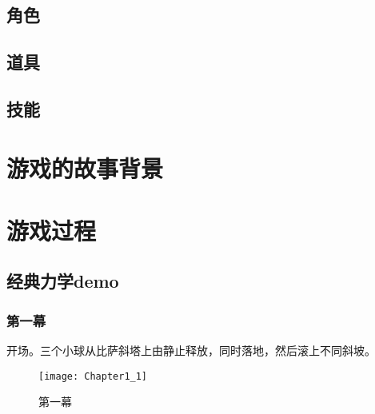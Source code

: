 \documentclass{tstextbook}
\begin{document}
\begin{summary}

\end{summary}

\section{角色}


\section{道具}


\section{技能}

\chapter{游戏的故事背景}

\begin{summary}

\end{summary}

\chapter{游戏过程}

\begin{summary}

\end{summary}

\section{经典力学demo}

\subsection{第一幕}

开场。三个小球从比萨斜塔上由静止释放，同时落地，然后滚上不同斜坡。

\begin{figure}[H]
\centering 
\texttt{[image: Chapter1\_1]} 
\caption{第一幕} 
\label{1.1} 
\end{figure}
\end{document}
